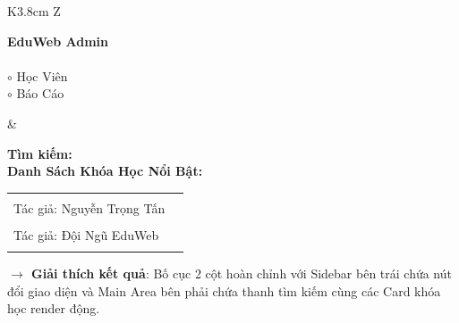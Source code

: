 \begin{browserWindow}
\sffamily\small
\begin{tcolorbox}[colback=gray!4, colframe=primaryBlue!30, arc=6pt, top=4pt, bottom=4pt, left=6pt, right=6pt]
\begin{tabularx}{\linewidth}{K{3.8cm} Z}
\begin{tcolorbox}[colback=primaryBlue, colframe=primaryBlue, arc=4pt, left=6pt, right=6pt, top=6pt, bottom=6pt]
\color{white}
\textbf{EduWeb Admin}\\[8pt]
\\[4pt]
$\circ$ Học Viên\\[3pt]
$\circ$ Báo Cáo\\[12pt]
\end{tcolorbox}
&
\begin{tcolorbox}[colback=white, colframe=gray!20, arc=4pt, left=8pt, right=8pt, top=6pt, bottom=6pt]
\textbf{Tìm kiếm:} \\[8pt]
\textbf{\color{primaryBlue} Danh Sách Khóa Học Nổi Bật:}\\[6pt]
\begin{tabular}{@{}l l@{}}
\begin{tcolorbox}[colback=white, colframe=primaryBlue!30, width=5.2cm, arc=4pt]
\textbf{\color{primaryBlue} HTML5 Masterclass 2026}\\[2pt]
\tiny Tác giả: Nguyễn Trọng Tấn\\[2pt]
\tcbox[on line, arc=2pt, colback=green!10, colframe=green!50, boxsep=1pt]{\color{green!60!black}\tiny Đang Hoạt Động}
\end{tcolorbox}
&
\begin{tcolorbox}[colback=white, colframe=primaryBlue!30, width=5.2cm, arc=4pt]
\textbf{\color{primaryBlue} Modern CSS Grid \& Flexbox}\\[2pt]
\tiny Tác giả: Đội Ngũ EduWeb\\[2pt]
\tcbox[on line, arc=2pt, colback=green!10, colframe=green!50, boxsep=1pt]{\color{green!60!black}\tiny Đang Hoạt Động}
\end{tcolorbox}
\end{tabular}
\end{tcolorbox}
\end{tabularx}
\end{tcolorbox}

\vspace{4pt}
\textbf{$\rightarrow$ Giải thích kết quả}: Bố cục 2 cột hoàn chỉnh với Sidebar bên trái chứa nút đổi giao diện và Main Area bên phải chứa thanh tìm kiếm cùng các Card khóa học render động.
\end{browserWindow}

